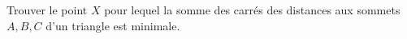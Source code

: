 Trouver le point $X$ pour lequel la somme des carrés des distances aux sommets $A, B, C$ d'un triangle est minimale.
